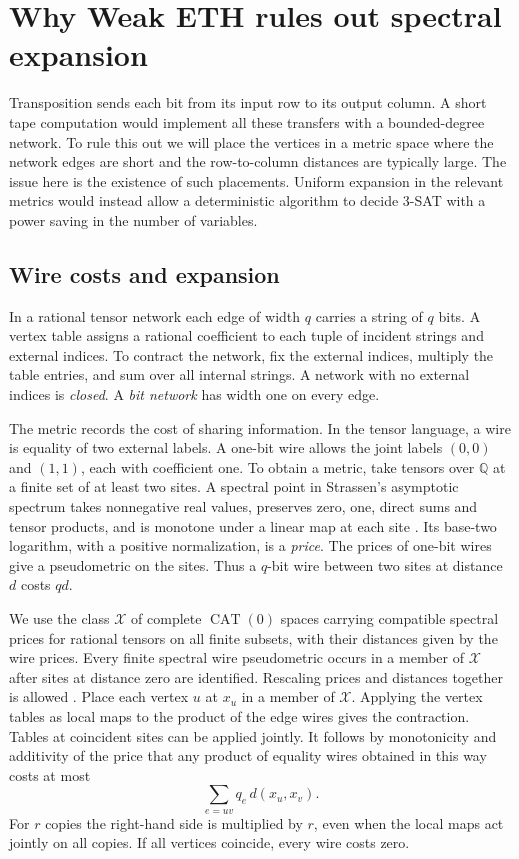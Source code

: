 \section{Why Weak ETH rules out spectral expansion}\label{sec:graphs}

Transposition sends each bit from its input row to its output column.
A short tape computation would implement all these transfers with a
bounded-degree network. To rule this out we will place the vertices
in a metric space where the network edges are short and the
row-to-column distances are typically large. The issue here is the
existence of such placements. Uniform expansion in the relevant
metrics would instead allow a deterministic algorithm to decide
3-SAT with a power saving in the number of variables.

\subsection{Wire costs and expansion}

In a rational tensor network each edge of width $q$ carries a string of
$q$ bits. A vertex table assigns a rational coefficient to each tuple
of incident strings and external indices. To contract the network,
fix the external indices, multiply the table entries, and sum over all
internal strings. A network with no external indices is \emph{closed}.
A \emph{bit network} has width one on every edge.

The metric records the cost of sharing information. In the tensor
language, a wire is equality of two external labels. A one-bit wire
allows the joint labels $(0,0)$ and $(1,1)$, each with coefficient one.
To obtain a metric, take tensors over $\mathbb Q$ at a finite set of at
least two sites. A spectral point in Strassen's asymptotic spectrum
takes nonnegative real values, preserves zero, one, direct sums and
tensor products, and is monotone under a linear map at each site
\cite{Strassen}. Its base-two logarithm, with a positive normalization,
is a \emph{price}. The prices of one-bit wires give a pseudometric on the
sites. Thus a $q$-bit wire between two sites at distance $d$ costs $qd$.

We use the class $\mathcal X$ of complete $\operatorname{CAT}(0)$
spaces carrying compatible spectral prices for rational tensors on
all finite subsets, with their distances given by the wire prices.
Every finite spectral wire pseudometric occurs in a member of
$\mathcal X$ after sites at distance zero are identified. Rescaling
prices and distances together is allowed
\cite[Sections~ and~,
Theorem~]{oaG}.
Place each vertex $u$ at $x_u$ in a member of $\mathcal X$. Applying
the vertex tables as local maps to the product of the edge wires gives
the contraction. Tables at coincident sites can be applied jointly.
It follows by monotonicity and additivity of the price that any product
of equality wires obtained in this way costs at most
\[
                 \sum_{e=uv} q_e\,d(x_u,x_v).
\]
For $r$ copies the right-hand side is multiplied by $r$, even when
the local maps act jointly on all copies. If all vertices coincide,
every wire costs zero.

